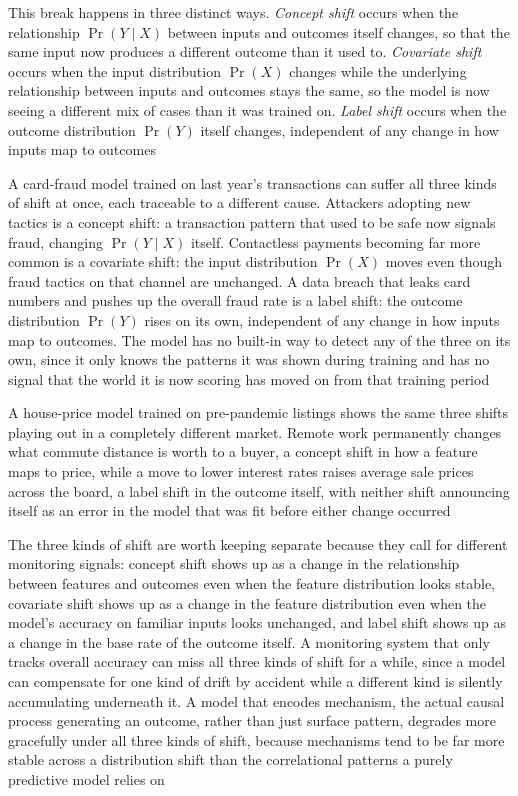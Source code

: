 This break happens in three distinct ways. \emph{Concept shift} occurs when the
relationship $\Pr(Y \mid X)$ between inputs and outcomes itself changes, so that
the same input now produces a different outcome than it used to. \emph{Covariate
shift} occurs when the input distribution $\Pr(X)$ changes while the underlying relationship
between inputs and outcomes stays the same, so the model is now seeing a
different mix of cases than it was trained on. \emph{Label shift} occurs when
the outcome distribution $\Pr(Y)$ itself changes, independent of any change in how
inputs map to outcomes

A card-fraud model trained on last year's transactions can suffer all three kinds
of shift at once, each traceable to a different cause. Attackers adopting new
tactics is a concept shift: a transaction pattern that used to be safe now
signals fraud, changing $\Pr(Y \mid X)$ itself. Contactless payments becoming far
more common is a covariate shift: the input distribution $\Pr(X)$ moves even
though fraud tactics on that channel are unchanged. A data breach that leaks
card numbers and pushes up the overall fraud rate is a label shift: the outcome
distribution $\Pr(Y)$ rises on its own, independent of any change in how inputs
map to outcomes. The model has no built-in way to detect any of the three on its
own, since it only knows the patterns it was shown during training and has no
signal that the world it is now scoring has moved on from that training period

A house-price model trained on pre-pandemic listings shows the same three shifts
playing out in a completely different market. Remote work permanently changes
what commute distance is worth to a buyer, a concept shift in how a feature maps
to price, while a move to lower interest rates raises average sale prices across
the board, a label shift in the outcome itself, with neither shift announcing
itself as an error in the model that was fit before either change occurred

The three kinds of shift are worth keeping separate because they call for different
monitoring signals: concept shift shows up as a change in the relationship
between features and outcomes even when the feature distribution looks stable, covariate
shift shows up as a change in the feature distribution even when the model's accuracy
on familiar inputs looks unchanged, and label shift shows up as a change in the
base rate of the outcome itself. A monitoring system that only tracks overall accuracy
can miss all three kinds of shift for a while, since a model can compensate for
one kind of drift by accident while a different kind is silently accumulating
underneath it. A model that encodes mechanism, the actual causal process
generating an outcome, rather than just surface pattern, degrades more
gracefully under all three kinds of shift, because mechanisms tend to be far more
stable across a distribution shift than the correlational patterns a purely predictive
model relies on

